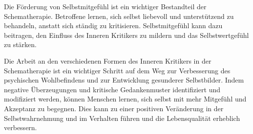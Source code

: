 Die Förderung von Selbstmitgefühl ist ein wichtiger Bestandteil der Schematherapie. Betroffene lernen, sich selbst liebevoll und unterstützend zu behandeln, anstatt sich ständig zu kritisieren. Selbstmitgefühl kann dazu beitragen, den Einfluss des Inneren Kritikers zu mildern und das Selbstwertgefühl zu stärken.

Die Arbeit an den verschiedenen Formen des Inneren Kritikers in der Schematherapie ist ein wichtiger Schritt auf dem Weg zur Verbesserung des psychischen Wohlbefindens und zur Entwicklung gesunderer Selbstbilder. Indem negative Überzeugungen und kritische Gedankenmuster identifiziert und modifiziert werden, können Menschen lernen, sich selbst mit mehr Mitgefühl und Akzeptanz zu begegnen. Dies kann zu einer positiven Veränderung in der Selbstwahrnehmung und im Verhalten führen und die Lebensqualität erheblich verbessern.